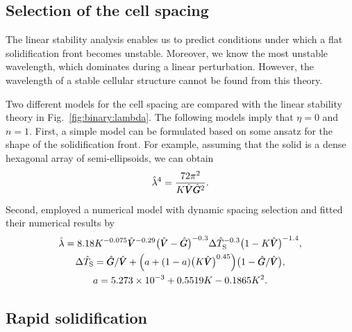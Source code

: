 \documentclass{article}
\newcommand{\sol}{\text{S}}
\newcommand{\hV}[1][\qty(\bar{V})]{\vphantom{#1}\mathrlap{\smash{\hat{V}}}V}
\newcommand{\hG}[1][\qty(\bar{G})]{\vphantom{#1}\mathrlap{\smash{\hat{G}}}G}
\begin{document}
\subsection{Selection of the cell spacing}

The linear stability analysis enables us to predict conditions
under which a flat solidification front becomes unstable.
Moreover, we know the most unstable wavelength, which dominates during a linear perturbation.
However, the wavelength of a stable cellular structure cannot be found from this theory.

Two different models for the cell spacing are compared with the linear stability theory
in Fig.~\ref{fig:binary:lambda}.
The following models imply that $\eta=0$ and $n=1$.
First, a simple model can be formulated based on some ansatz for the shape of the solidification front.
For example, assuming that the solid is a dense hexagonal array of semi-ellipsoids,
we can obtain~\cite{dantzig2016solidification}
\begin{equation}\label{eq:cell_spacing}
    \hat\lambda^4 = \frac{72\pi^2}{K\hV\hG^2}.
\end{equation}
Second, \textcite{hunt1996numerical} employed a numerical model with dynamic spacing selection
and fitted their numerical results by
\begin{equation}\label{eq:Hunt96}
    \begin{gathered}
        \hat\lambda = 8.18 K^{-0.075}\hV^{-0.29}\qty(\hV - \hG)^{-0.3}\Delta\hat{T}_\sol^{-0.3}\qty(1-K\hV)^{-1.4}, \\
        \Delta\hat{T}_\sol = \hG/\hV + \qty(a + (1-a)\qty(K\hV)^{0.45})\qty(1-\hG/\hV), \\
        a = \num{5.273e-3} + 0.5519K - 0.1865K^2.
    \end{gathered}
\end{equation}

\subsection{Rapid solidification}
\end{document}
